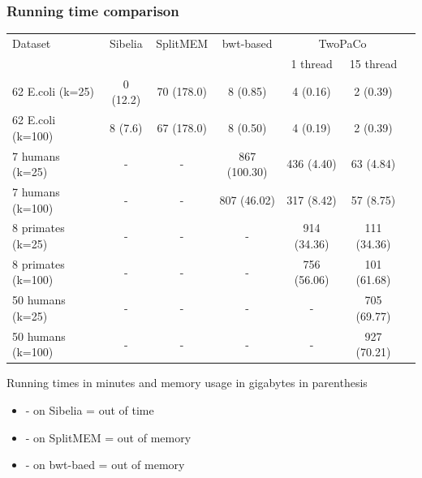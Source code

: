 \begin{frame}
	\frametitle{Running time comparison}
	
	\centering

	
    \begin{tabular}{ | l | c | c | c | c | c | c | }
    \hline
    Dataset    &  Sibelia &   SplitMEM &     bwt-based &  \multicolumn{2}{c|}{TwoPaCo} \\
               &          &            &               & 1 thread & 15 thread\\ \hline
               
    62 E.coli (k=25)   & 0 (12.2) & 70 (178.0) &      8 (0.85) &    4 (0.16) & 2 (0.39) \\
    62 E.coli (k=100)  &  8 (7.6) & 67 (178.0) &      8 (0.50) &    4 (0.19) & 2 (0.39) \\ \hline
    
    7 humans (k=25)    &        - &          - &  867 (100.30) &  436 (4.40) & 63 (4.84) \\ 
    7 humans (k=100)   &        - &          - &   807 (46.02) &  317 (8.42) & 57 (8.75) \\ \hline
    
    8 primates (k=25)  &        - &          - &             - & 914 (34.36) & 111 (34.36) \\
    8 primates (k=100) &        - &          - &             - & 756 (56.06) & 101 (61.68) \\ \hline
    
    50 humans (k=25)   &        - &          - &             - &          -  & 705 (69.77) \\
    50 humans (k=100)  &        - &          - &             - &          -  & 927 (70.21) \\ \hline
     
    \end{tabular}
    
    \medskip
    
    Running times in minutes and memory usage in gigabytes in parenthesis
    
    \medskip
    
    \begin{itemize}
      \item - on Sibelia = out of time
      \item - on SplitMEM = out of memory
      \item - on bwt-baed = out of memory
    \end{itemize}

  

\end{frame}
